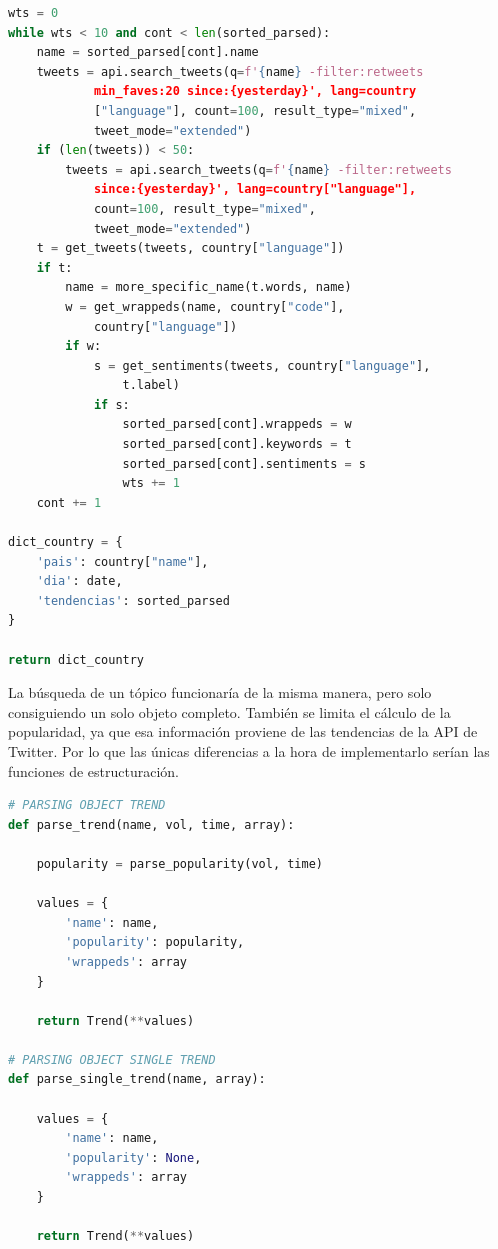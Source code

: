 \begin{lstlisting}[caption=Creación de la estructura constituyente,          label={lst:listing-python},language=Python]
wts = 0
while wts < 10 and cont < len(sorted_parsed):
    name = sorted_parsed[cont].name
    tweets = api.search_tweets(q=f'{name} -filter:retweets
            min_faves:20 since:{yesterday}', lang=country
            ["language"], count=100, result_type="mixed",
            tweet_mode="extended")
    if (len(tweets)) < 50:
        tweets = api.search_tweets(q=f'{name} -filter:retweets
            since:{yesterday}', lang=country["language"],
            count=100, result_type="mixed",
            tweet_mode="extended")
    t = get_tweets(tweets, country["language"])
    if t:
        name = more_specific_name(t.words, name)
        w = get_wrappeds(name, country["code"],
            country["language"])
        if w:
            s = get_sentiments(tweets, country["language"],
                t.label)
            if s:
                sorted_parsed[cont].wrappeds = w
                sorted_parsed[cont].keywords = t
                sorted_parsed[cont].sentiments = s
                wts += 1
    cont += 1

dict_country = {
    'pais': country["name"],
    'dia': date,
    'tendencias': sorted_parsed
}

return dict_country
\end{lstlisting}

La búsqueda de un tópico funcionaría de la misma manera, pero solo consiguiendo un solo objeto completo. También se limita el cálculo de la popularidad, ya que esa información proviene de las tendencias de la API de Twitter. Por lo que las únicas diferencias a la hora de implementarlo serían las funciones de estructuración.

\vspace{0.3cm}

\begin{lstlisting}[caption=Estructuración de la tendencia,          label={lst:listing-python},language=Python]
# PARSING OBJECT TREND
def parse_trend(name, vol, time, array):

    popularity = parse_popularity(vol, time)

    values = {
        'name': name,
        'popularity': popularity,
        'wrappeds': array
    }

    return Trend(**values)

# PARSING OBJECT SINGLE TREND
def parse_single_trend(name, array):

    values = {
        'name': name,
        'popularity': None,
        'wrappeds': array
    }

    return Trend(**values)
\end{lstlisting}

